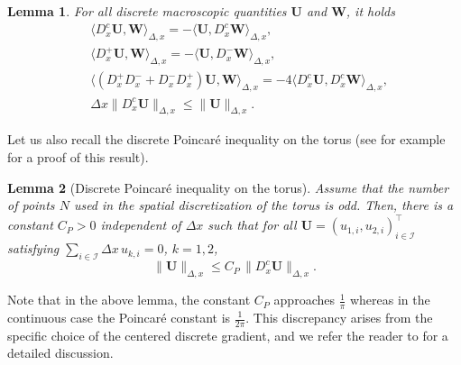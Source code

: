 \documentclass[reqno]{amsart}
\newtheorem{Lemma}{Lemma}
\newcommand{\Dx}{\Delta x}
\newcommand{\II}{\mathcal{I}}
\numberwithin{equation}{section}
\begin{document}
\begin{Lemma}\label{ref_IPP_discret}
   For all discrete macroscopic quantities $\mathbf{U}$ and $\mathbf{W}$, it holds
    \begin{align}
       & \langle D_x^c \mathbf{U},\mathbf{W}\rangle_{\Delta,x}=-\langle \mathbf{U},D_x^c\mathbf{W}\rangle_{\Delta,x}, \label{IPP_centre}\\
       & \langle D_x^+ \mathbf{U},\mathbf{W}\rangle_{\Delta,x}=-\langle \mathbf{U},D_x^-\mathbf{W}\rangle_{\Delta,x} \label{IPP_decentre},\\
       & \langle (D_x^+D_x^- + D_x^-D_x^+) \mathbf{U},\mathbf{W}\rangle_{\Delta,x}=-4\langle D_x^c\mathbf{U},D_x^c\mathbf{W}\rangle_{\Delta,x} \label{IPP2_decentre},\\
       & \Dx\|D_x^c \mathbf{U}\|_{\Delta,x} \leq \|\mathbf{U}\|_{\Delta,x} \label{estim_dxu_disc}.
    \end{align}
\end{Lemma}

Let us also recall the discrete Poincaré inequality on the torus (see for example \cite[Lemma 6]{BessemoulinHerdaRey2020} for a proof of this result).

\begin{Lemma}[Discrete Poincaré inequality on the torus]\label{lem_Poincare_dis}
    Assume that the number of points $N$ used in the spatial discretization of the torus is odd. Then, there is a constant $C_P>0$ independent of $\Dx$ such that for all $\mathbf{U}=\left( u_{1,i}, u_{2,i} \right)^\top_{i\in\II}$ satisfying $\sum_{i\in\II}\Dx\,u_{k,i}=0$, $k=1,2$,
    \[\|\mathbf{U}\|_{\Delta,x}\leq C_P\,\|D_x^c \mathbf{U}\|_{\Delta,x}.\]
\end{Lemma}
Note that in the above lemma, the constant $C_P$ approaches $\frac{1}{\pi}$ whereas in the continuous case the Poincaré constant is $\frac{1}{2\pi}$. This discrepancy arises from the specific choice of the centered discrete gradient, and we refer the reader to \cite{BessemoulinHerdaRey2020} for a detailed discussion. 
\end{document}
